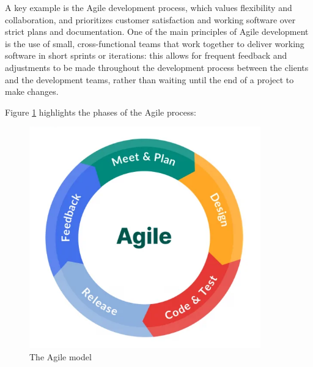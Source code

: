 A key example is the Agile development process, which values flexibility and collaboration, and prioritizes customer satisfaction and working software over strict plans and documentation. One of the main principles of Agile development is the use of small, cross-functional teams that work together to deliver working software in short sprints or iterations: this allows for frequent feedback and adjustments to be made throughout the development process between the clients and the development teams, rather than waiting until the end of a project to make changes.

Figure \ref{agile_model} highlights the phases of the Agile process:

\begin{figure}[h]
    \centering
    \includegraphics[width=10cm, scale=0.2]{figures/agile_model.jpg}
    \caption{The Agile model}
    \label{agile_model}
\end{figure}

